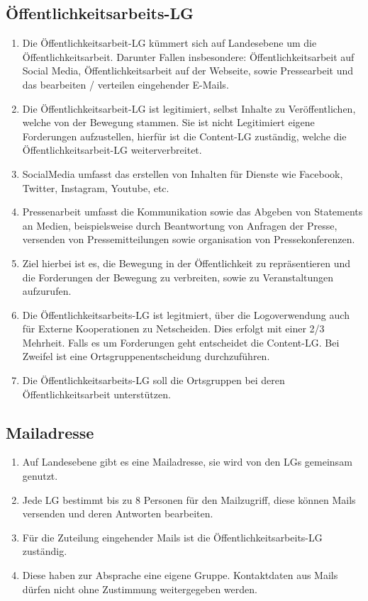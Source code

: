 \documentclass[a4paper,
  ]{scrartcl}
\begin{document}
\subsection{Öffentlichkeitsarbeits-LG}
\begin{enumerate}
      \item Die Öffentlichkeitsarbeit-LG kümmert sich auf Landesebene um die Öffentlichkeitsarbeit. Darunter
            Fallen insbesondere: Öffentlichkeitsarbeit auf Social Media, Öffentlichkeitsarbeit auf der
            Webseite, sowie Pressearbeit und das bearbeiten / verteilen eingehender E-Mails.
      \item Die Öffentlichkeitsarbeit-LG ist legitimiert, selbst Inhalte zu Veröffentlichen, welche von der
            Bewegung stammen. Sie ist nicht Legitimiert eigene Forderungen aufzustellen, hierfür ist die
            Content-LG zuständig, welche die Öffentlichkeitsarbeit-LG weiterverbreitet.
      \item SocialMedia umfasst das erstellen von Inhalten für Dienste wie Facebook, Twitter, Instagram,
            Youtube, etc.
      \item Pressenarbeit umfasst die Kommunikation sowie das Abgeben von Statements an Medien,
            beispielsweise durch Beantwortung von Anfragen der Presse, versenden von Pressemitteilungen
            sowie organisation von Pressekonferenzen.
      \item Ziel hierbei ist es, die Bewegung in der Öffentlichkeit zu repräsentieren und die Forderungen der
            Bewegung zu verbreiten, sowie zu Veranstaltungen aufzurufen.
      \item Die Öffentlichkeitsarbeits-LG ist legitmiert, über die Logoverwendung auch für Externe
            Kooperationen zu Netscheiden. Dies erfolgt mit einer 2/3 Mehrheit. Falls es um Forderungen
            geht entscheidet die Content-LG. Bei Zweifel ist eine Ortsgruppenentscheidung durchzuführen.
      \item Die Öffentlichkeitsarbeits-LG soll die Ortsgruppen bei deren Öffentlichkeitsarbeit unterstützen.
\end{enumerate}
\subsection{Mailadresse}
\begin{enumerate}
      \item Auf Landesebene gibt es eine Mailadresse, sie wird von den LGs gemeinsam genutzt.
      \item Jede LG bestimmt bis zu 8 Personen für den Mailzugriff, diese können Mails versenden und deren
            Antworten bearbeiten.
      \item Für die Zuteilung eingehender Mails ist die Öffentlichkeitsarbeits-LG zuständig.
      \item Diese haben zur Absprache eine eigene Gruppe. Kontaktdaten aus Mails dürfen nicht ohne
            Zustimmung weitergegeben werden.
\end{enumerate}
\end{document}
